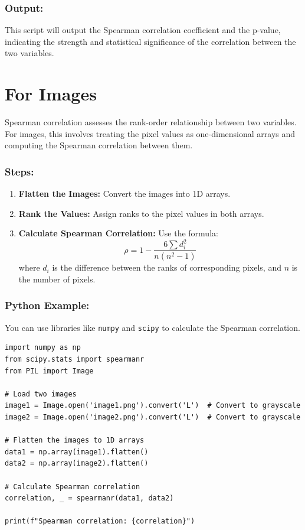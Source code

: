 \documentclass[11pt]{article}
\begin{document}
\subsubsection{Output:}
\label{sec:orgc14d131}
This script will output the Spearman correlation coefficient and the p-value, indicating the strength and statistical significance of the correlation between the two variables.
\section{For Images}
\label{sec:org8f54237}
Spearman correlation assesses the rank-order relationship between two variables. For images, this involves treating the pixel values as one-dimensional arrays and computing the Spearman correlation between them.
\subsubsection{Steps:}
\label{sec:org38e5bef}

\begin{enumerate}
\item \textbf{Flatten the Images:} Convert the images into 1D arrays.
\item \textbf{Rank the Values:} Assign ranks to the pixel values in both arrays.
\item \textbf{Calculate Spearman Correlation:} Use the formula:
\[
   \rho = 1 - \frac{6 \sum d_i^2}{n(n^2 - 1)}
   \]
where \(d_i\) is the difference between the ranks of corresponding pixels, and \(n\) is the number of pixels.
\end{enumerate}
\subsubsection{Python Example:}
\label{sec:org31e6003}

You can use libraries like \texttt{numpy} and \texttt{scipy} to calculate the Spearman correlation.

\begin{verbatim}
import numpy as np
from scipy.stats import spearmanr
from PIL import Image

# Load two images
image1 = Image.open('image1.png').convert('L')  # Convert to grayscale
image2 = Image.open('image2.png').convert('L')  # Convert to grayscale

# Flatten the images to 1D arrays
data1 = np.array(image1).flatten()
data2 = np.array(image2).flatten()

# Calculate Spearman correlation
correlation, _ = spearmanr(data1, data2)

print(f"Spearman correlation: {correlation}")
\end{verbatim}
\end{document}
